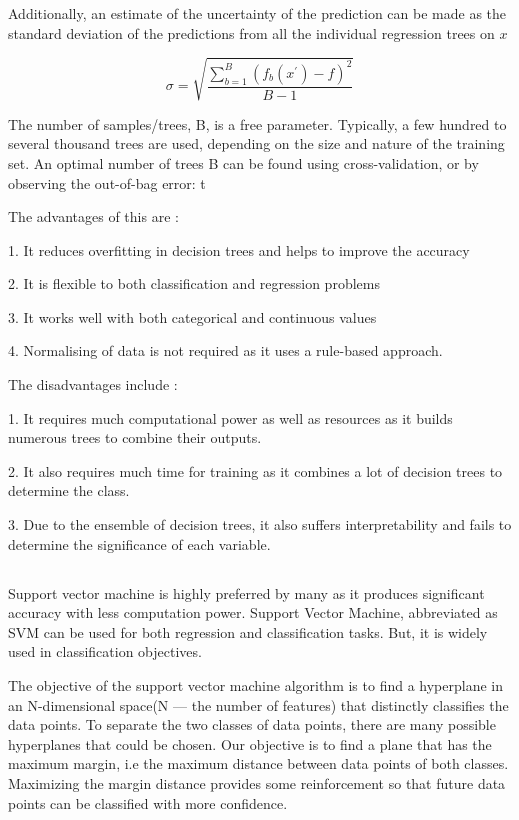 \documentclass[12pt]{article}
\newcommand{\msize}{\fontsize{14pt}{12pt}\selectfont}
\begin{document}
Additionally, an estimate of the uncertainty of the prediction can be made as the standard deviation of the predictions from all the individual regression trees on $x$ 

\begin{equation*}
\sigma= \sqrt{\frac{\sum_{b=1}^{B}{(f_b(x^{'})-f)^{2}}}{B-1}}
\end{equation*}

The number of samples/trees, B, is a free parameter. Typically, a few hundred to several thousand trees are used, depending on the size and nature of the training set. An optimal number of trees B can be found using cross-validation, or by observing the out-of-bag error: t

The advantages of this are : 

1. It reduces overfitting in decision trees and helps to improve the accuracy

2. It is flexible to both classification and regression problems

3. It works well with both categorical and continuous values

4. Normalising of data is not required as it uses a rule-based approach.

The disadvantages include : 

1. It requires much computational power as well as resources as it builds numerous trees to combine their outputs. 

2. It also requires much time for training as it combines a lot of decision trees to determine the class.

3. Due to the ensemble of decision trees, it also suffers interpretability and fails to determine the significance of each variable.
\newpage 
\subsection{\msize{\textbf{SUPPORT VECTOR MACHINES}}}
Support vector machine is highly preferred by many as it produces significant accuracy with less computation power. Support Vector Machine, abbreviated as SVM can be used for both regression and classification tasks. But, it is widely used in classification objectives.

The objective of the support vector machine algorithm is to find a hyperplane in an N-dimensional space(N — the number of features) that distinctly classifies the data points. To separate the two classes of data points, there are many possible hyperplanes that could be chosen. Our objective is to find a plane that has the maximum margin, i.e the maximum distance between data points of both classes. Maximizing the margin distance provides some reinforcement so that future data points can be classified with more confidence.
\end{document}
